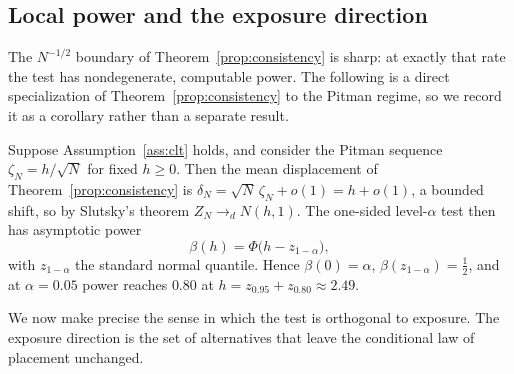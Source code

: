 \documentclass[risks,article,submit,pdftex,oneauthor]{Definitions/mdpi}
\begin{document}
\subsection{Local power and the exposure direction}
\label{sec:local-power}

The $N^{-1/2}$ boundary of Theorem~\ref{prop:consistency} is sharp: at exactly
that rate the test has nondegenerate, computable power. The following is a direct
specialization of Theorem~\ref{prop:consistency} to the Pitman regime, so we
record it as a corollary rather than a separate result.

\begin{Corollary}
\label{prop:local-power}
Suppose Assumption~\ref{ass:clt} holds, and consider the Pitman sequence
$\zeta_N=h/\sqrt N$ for fixed $h\ge0$. Then the mean displacement of
Theorem~\ref{prop:consistency} is $\delta_N=\sqrt N\,\zeta_N+o(1)=h+o(1)$, a
bounded shift, so by Slutsky's theorem $Z_N\to_d N(h,1)$. The one-sided
level-$\alpha$ test then has asymptotic power
\[
\beta(h)=\Phi\big(h-z_{1-\alpha}\big),
\]
with $z_{1-\alpha}$ the standard normal quantile. Hence $\beta(0)=\alpha$,
$\beta(z_{1-\alpha})=\tfrac12$, and at $\alpha=0.05$ power reaches $0.80$ at
$h=z_{0.95}+z_{0.80}\approx2.49$.
\end{Corollary}

We now make precise the sense in which the test is orthogonal to exposure. The
exposure direction is the set of alternatives that leave the conditional law of
placement unchanged.
\end{document}
